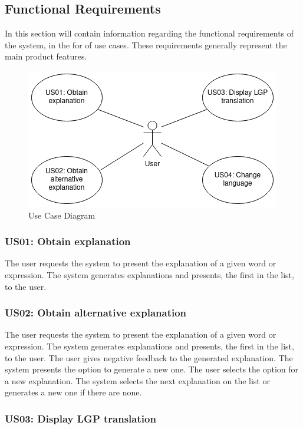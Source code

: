 \subsection{Functional Requirements}

In this section will contain information regarding the functional requirements of the system, in the for of use cases.
These requirements generally represent the main product features.

\begin{figure}[H]
\centering
\includegraphics[scale=0.65]{ch3/assets/usecasediagram.png}
\caption[Use Case Diagram]{Use Case Diagram}
\label{fig:ucDiagram}
\end{figure}

\subsubsection{US01: Obtain explanation}

The user requests the system to present the explanation of a given word or expression.
The system generates explanations and presents, the first in the list, to the user.

\subsubsection{US02: Obtain alternative explanation}

The user requests the system to present the explanation of a given word or expression.
The system generates explanations and presents, the first in the list, to the user.
The user gives negative feedback to the generated explanation.
The system presents the option to generate a new one.
The user selects the option for a new explanation.
The system selects the next explanation on the list or generates a new one if there are none.

\subsubsection{US03: Display LGP translation}

